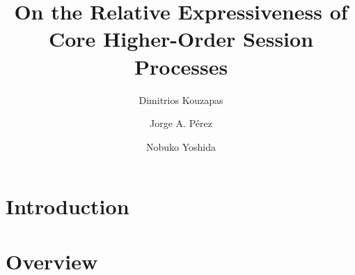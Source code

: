 \documentclass[runningheads]{llncs}
\begin{document}



\title{On the Relative Expressiveness of \\ Core Higher-Order Session Processes}

\author{
	Dimitrios Kouzapas%
	\and
	Jorge A. P\'{e}rez
	\and Nobuko Yoshida
}
\maketitle









%

%

\section{Introduction}
\label{sec:intro}
%


\section{Overview} %
\label{sec:overview}

\end{document}
